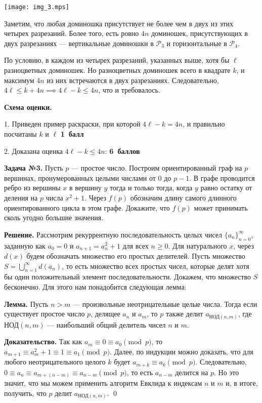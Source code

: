 \documentclass[12pt]{article}
\def\avtor#1{\linebreak[2] \hspace*{\fill}{\small (\mbox{\textit{#1})}}}
\def \Problem#1{\par \bigskip \textbf{Задача №{#1}. }}
\def \solution{\par \bigskip \textbf{Решение. }}
\def \Lemma{\par \bigskip \textbf{Лемма. }}
\def \proof{\par \bigskip \textbf{Доказательство. }}
\def \marking{\par \bigskip \textbf{Схема оценки. }}
\def\geq{\geqslant}
\def\leq{\leqslant}
\begin{document}
\medskip
\centerline{\texttt{[image: img\_3.mps]}}
\medskip

Заметим, что любая доминошка присутствует не более чем в двух из этих четырех разрезаний. Более того, есть ровно $4n$ доминошек, присутствующих в двух разрезаниях --- вертикальные доминошки в $\mathcal P_3$ и горизонтальные в $\mathcal P_4$.

По условию, в каждом из четырех разрезаний, указанных выше, хотя бы $\ell$ разноцветных доминошек. Но разноцветных доминошек всего в квадрате $k$, и максимум $4n$ из них встречаются в двух разрезаниях. Следовательно, $4 \ell \leq k + 4n \implies 4 \ell - k \leq 4n$, что и требовалось.

\marking

1. Приведен пример раскраски, при которой $4 \ell - k = 4n$, и правильно посчитаны $k$ и $\ell$ \dotfill\textbf{1~балл}

2. Доказана оценка $4 \ell - k \leq 4n$: \dotfill\textbf{6~баллов}


\Problem{3} Пусть $p$ --- простое число. Построим ориентированный граф на $p$ вершинах, пронумерованных целыми числами от $0$ до $p - 1$. В графе проводится ребро из вершины $x$ в вершину $y$ тогда и только тогда, когда $y$ равно остатку от деления на $p$ числа $x^2 + 1$. Через $f(p)$ обозначим длину самого длинного ориентированного цикла в этом графе. Докажите, что $f(p)$ может принимать сколь угодно большие значения. \avtor{Зиманов~А.}

\solution Рассмотрим рекуррентную последовательность целых чисел $\{ a_{n} \}_{n = 0}^{\infty}$, заданную как $a_{0} = 0$ и $a_{n + 1} = a_{n}^2 + 1$ для всех $n \geq 0$. Для натурального $x$, через $d(x)$ будем обозначать множество его простых делителей. Пусть множество $S = \bigcup_{n = 1}^{\infty} d(a_n)$, то есть множество всех простых чисел, которые делят хотя бы один положительный элемент последовательности. Докажем, что множество $S$ бесконечно. Для этого нам понадобится следующая лемма:

\Lemma Пусть $n > m$ --- произвольные неотрицательные целые числа. Тогда если существует простое число $p$, делящее $a_n$ и $a_m$, то $p$ также делит $a_{\text{НОД}(n, m)}$, где $\text{НОД}(n, m)$ --- наибольший общий делитель чисел $n$ и $m$.

\proof Так как $a_m \equiv 0 \equiv a_0 \pmod{p}$, то $a_{m + 1} \equiv a_{m}^2 + 1 \equiv 1 \equiv a_{1} \pmod{p}$. Далее, по индукции можно доказать, что для любого неотрицательного целого $k$ будет $a_{m + k} \equiv a_{k} \pmod{p}$. Следовательно, $0 \equiv a_{n} \equiv a_{m + (n - m)} \equiv a_{n - m} \pmod{p}$, то есть $a_{n - m}$ делится на $p$. Но это значит, что мы можем применить алгоритм Евклида к индексам $n$ и $m$ и, в итоге, получить, что $p$ делит $a_{\text{НОД}(n, m)}$.
\qed
\end{document}
